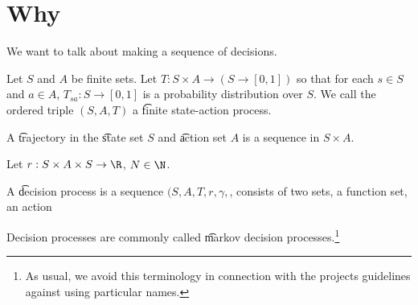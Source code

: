 
\section*{Why}

We want to talk about making a sequence of decisions.


Let $S$ and $A$ be finite sets.
Let $T: S \times  A \to (S \to [0, 1])$ so that for each $s \in S$ and $a \in A$, $T_{sa}: S \to [0, 1]$ is a probability distribution over $S$.
We call the ordered triple $(S, A, T)$ a \t{finite state-action process}.

A \t{trajectory} in the \t{state set} $S$ and \t{action set} $A$ is a sequence in $S \times  A$.

Let $r: S \times  A \times  S \to \R $, $N \in \N  $.

A \t{decision process} is a sequence $(S, A, T, r, \gamma , $, consists of two sets, a function set, an action

Decision processes are commonly called \t{markov decision processes}.\footnote{As usual, we avoid this terminology in connection with the projects guidelines against using particular names.}

\blankpage
